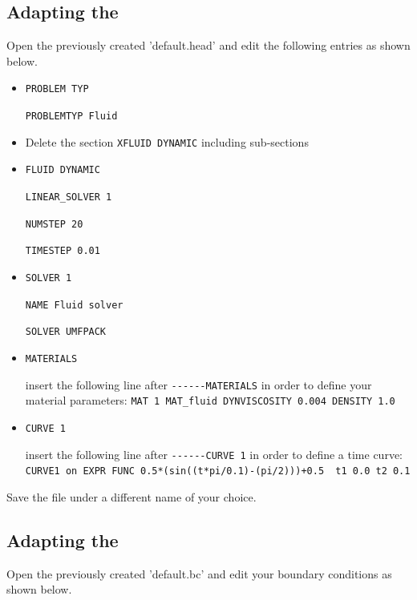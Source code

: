 \subsection{Adapting the \head}
Open the previously created \head 'default.head' and edit the following entries as shown below.
\begin{itemize}
 \item \verb|PROBLEM TYP|

 \verb|PROBLEMTYP Fluid|
 
 \item Delete the section \verb|XFLUID DYNAMIC| including sub-sections
 
 \item \verb|FLUID DYNAMIC|

 \verb|LINEAR_SOLVER 1|

 \verb|NUMSTEP 20|

 \verb|TIMESTEP 0.01|

 \item \verb|SOLVER 1|
 
 \verb|NAME Fluid solver|

 \verb|SOLVER UMFPACK|

 \item \verb|MATERIALS|

 insert the following line after \verb|------MATERIALS| in order to define your material parameters: \newline
 \verb|MAT 1 MAT_fluid DYNVISCOSITY 0.004 DENSITY 1.0|

 \item \verb|CURVE 1|

 insert the following line after \verb|------CURVE 1| in order to define a time curve: \\
 \verb|CURVE1 on EXPR FUNC 0.5*(sin((t*pi/0.1)-(pi/2)))+0.5  t1 0.0 t2 0.1|
 
\end{itemize}
Save the file under a different name of your choice.

\subsection{Adapting the \bc}
Open the previously created \bc 'default.bc' and edit your boundary conditions as shown below.


